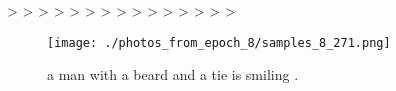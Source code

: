 \documentclass{article}%
\begin{document}
>\newline%
>\newline%
>\newline%
>\newline%
>\newline%
>\newline%
>\newline%
>\newline%
>\newline%
>\newline%
>\newline%
>\newline%
>\newline%
>\newline%
>\newline%

%


\begin{figure}[h!]%
\centering%
\texttt{[image: ./photos\_from\_epoch\_8/samples\_8\_271.png]}%
\caption{a man with a beard and a tie is smiling .}%
\end{figure}

%
\end{document}
